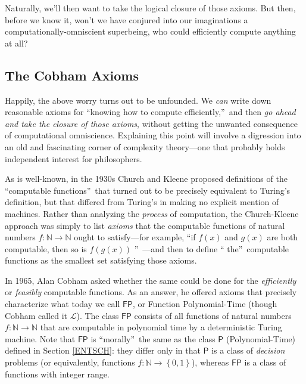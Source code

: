 \documentclass[12pt,onecolumn]{article}%
\begin{document}
\noindent Naturally, we'll then want to take the logical closure of those
axioms. But then, before we know it, won't we have conjured into our
imaginations a computationally-omniscient superbeing, who could efficiently
compute anything at all?

\subsection{The Cobham Axioms\label{COBHAM}}

Happily, the above worry turns out to be unfounded. We \textit{can} write
down reasonable axioms for \textquotedblleft knowing how to compute
efficiently,\textquotedblright\  and then \textit{go ahead and take the closure
of those axioms}, without getting the unwanted consequence of computational
omniscience. Explaining this point will involve a digression into an old and
fascinating corner of complexity theory---one that probably holds independent
interest for philosophers.

As is well-known, in the 1930s Church and Kleene proposed definitions of the
\textquotedblleft computable functions\textquotedblright\  that turned out to
be precisely equivalent to Turing's definition, but that differed from
Turing's in making no explicit mention of machines. Rather than analyzing
the \textit{process} of computation, the Church-Kleene approach was simply to
list \textit{axioms} that the computable functions of natural numbers
$f:\mathbb{N}\rightarrow\mathbb{N}$ ought to satisfy---for example,
\textquotedblleft if $f(x)  $ and $g(x)  $ are both
computable, then so is $f (g(x) )  $%
\textquotedblright\ ---and then to define \textquotedblleft
the\textquotedblright\  computable functions as the smallest set satisfying
those axioms.

In 1965, Alan Cobham \cite{cobham} asked whether the same could be done for
the \textit{efficiently} or \textit{feasibly} computable functions. As an
answer, he offered axioms that precisely characterize what today we call
$\mathsf{FP}$, or Function Polynomial-Time (though Cobham called it
$\mathcal{L}$). The class $\mathsf{FP}$ consists of all functions of
natural numbers $f:\mathbb{N}\rightarrow\mathbb{N}$ that are computable in
polynomial time by a deterministic Turing machine. Note that $\mathsf{FP}%
$ is \textquotedblleft morally\textquotedblright\  the same as the class
$\mathsf{P}$ (Polynomial-Time) defined in Section \ref{ENTSCH}: they differ
only in that $\mathsf{P}$ is a class of \textit{decision} problems (or
equivalently, functions $f:\mathbb{N}\rightarrow\left\{  0,1\right\}  $),
whereas $\mathsf{FP}$ is a class of functions with integer range.
\end{document}
